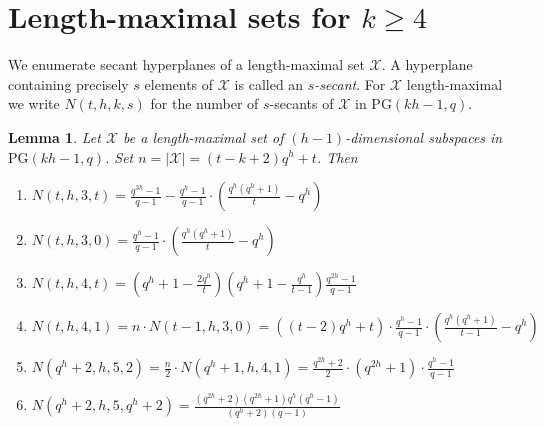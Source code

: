 \documentclass[12pt, twoside]{article}
\newtheorem{lemma}[theorem]{\bf Lemma}
\begin{document}
	\section{Length-maximal sets for $k \ge 4$}\label{sec: k ge 4}
	
	We enumerate secant hyperplanes of a length-maximal set $\mathcal{X}$. A hyperplane containing precisely $s$ elements of $\mathcal{X}$ is called an \emph{$s$-secant}. For $\mathcal{X}$ length-maximal we write $N(t,h,k,s)$ for the number of $s$-secants of $\mathcal{X}$ in $\mathrm{PG}(kh-1,q)$.
	
	\begin{lemma}\label{lem: enumerating secants}
		Let $\mathcal{X}$ be a length-maximal set of $(h-1)$-dimensional subspaces in $\mathrm{PG}(kh-1,q)$. Set $n = |\mathcal{X}| = (t-k+2)q^h+t$. Then
		
		\begin{enumerate}
			\item $\displaystyle N(t,h,3,t) = \frac{q^{3h}-1}{q-1} -\frac{q^h-1}{q-1}\cdot\left(\frac{q^h(q^h+1)}{t}-q^h\right)$ \label{part 1: lem: enumerating secants}
			
			\item $\displaystyle N(t,h,3,0) = \frac{q^h-1}{q-1}\cdot\left(\frac{q^h(q^h+1)}{t}-q^h\right)$ \label{part 2: lem: enumerating secants}
			
			\item $\displaystyle N(t,h,4,t) = \left( q^h + 1 - \frac{2q^h}{t} \right) \left( q^h + 1 - \frac{q^h}{t-1} \right) \frac{q^{2h}-1}{q-1}$ \label{part 3: lem: enumerating secants}
			
			\item $\displaystyle N(t,h,4,1) = n\cdot N(t-1,h,3,0) =\left((t-2)q^h + t\right) \cdot \frac{q^h-1}{q-1}\cdot \left(  \frac{q^h(q^h+1)}{t-1}-q^h \right)$ \label{part 4: lem: enumerating secants}
			
			\item $\displaystyle N(q^h+2,h,5,2) = \frac{n}{2}\cdot N(q^h+1,h,4,1) = \frac{q^{2h}+2}{2}\cdot (q^{2h}+1)\cdot\frac{q^h-1}{q-1}$ \label{part 5: lem: enumerating secants}
			
			\item $\displaystyle N(q^h+2,h,5,q^h+2) = \frac{(q^{2h}+2)(q^{2h}+1)q^h(q^h-1)}{(q^h+2)(q-1)}$ \label{part 6: lem: enumerating secants}
		\end{enumerate}
	\end{lemma}
	
\end{document}
